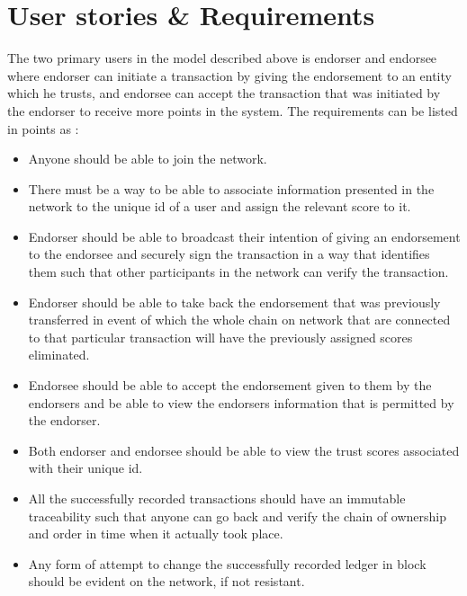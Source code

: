 \section{ User stories \& Requirements}
The two primary users in the model described above is endorser and endorsee 
where endorser can initiate a transaction by giving the endorsement to an 
entity which he trusts, and endorsee can accept the transaction that was 
initiated by the endorser to receive more points in the system. 
The requirements can be listed in points as : \\
\begin{itemize}
\item Anyone should be able to join the network.  
\item There must be a way to be able to associate information presented in the 
network to the unique id of a user and assign the relevant score to it.
\item Endorser should be able to broadcast their intention of giving an 
endorsement to the endorsee and securely sign the transaction in a way that 
identifies them such that other participants in the network can verify the 
transaction. 
\item Endorser should be able to take back the endorsement that was previously 
transferred in event of which the whole chain on network that are connected 
to that particular transaction will have the previously assigned scores 
eliminated. 
\item Endorsee should be able to accept the endorsement given to them by the  
endorsers and be able to view the endorsers information that is permitted by 
the endorser. 
\item Both endorser and endorsee should be able to view the trust scores 
associated with their unique id. 
\item All the successfully recorded transactions should have an immutable 
traceability such that anyone can go back and verify the chain of ownership 
and order in time when it actually took place. 
\item Any form of attempt to change the successfully recorded ledger in block 
should be evident on the network, if not resistant. 
\end{itemize}

